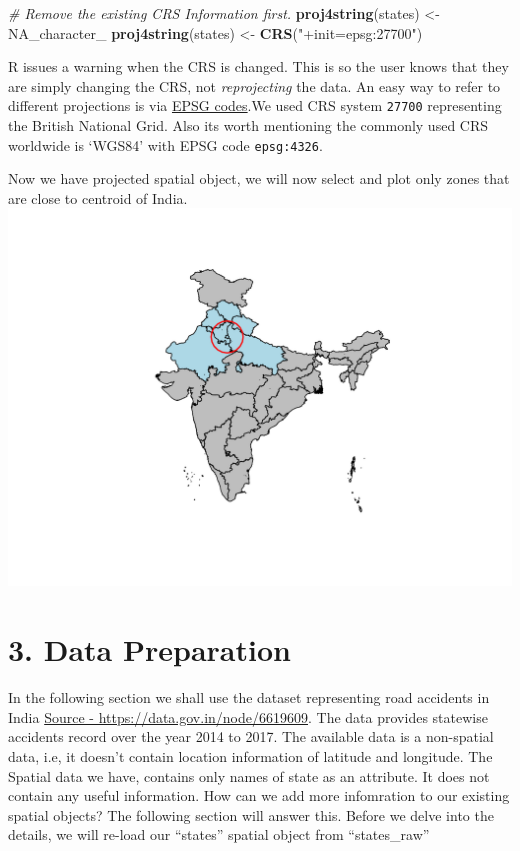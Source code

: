 \documentclass[]{article}
\newenvironment{Shaded}{}{}
\newcommand{\CommentTok}[1]{\textcolor[rgb]{0.38,0.63,0.69}{\textit{#1}}}
\newcommand{\KeywordTok}[1]{\textcolor[rgb]{0.00,0.44,0.13}{\textbf{#1}}}
\newcommand{\NormalTok}[1]{#1}
\newcommand{\OtherTok}[1]{\textcolor[rgb]{0.00,0.44,0.13}{#1}}
\newcommand{\StringTok}[1]{\textcolor[rgb]{0.25,0.44,0.63}{#1}}
\begin{document}
\begin{Shaded}
\begin{Highlighting}[]
\CommentTok{# Remove the existing CRS Information first.}
\KeywordTok{proj4string}\NormalTok{(states) <-}\StringTok{ }\OtherTok{NA_character_}
\KeywordTok{proj4string}\NormalTok{(states) <-}\StringTok{ }\KeywordTok{CRS}\NormalTok{(}\StringTok{"+init=epsg:27700"}\NormalTok{)}
\end{Highlighting}
\end{Shaded}

R issues a warning when the CRS is changed. This is so the user knows
that they are simply changing the CRS, not \emph{reprojecting} the data.
An easy way to refer to different projections is via
\href{http://www.epsg-registry.org/}{EPSG codes}.We used CRS system
\texttt{27700} representing the British National Grid. Also its worth
mentioning the commonly used CRS worldwide is `WGS84' with EPSG code
\texttt{epsg:4326}.

Now we have projected spatial object, we will now select and plot only
zones that are close to centroid of India.
\includegraphics{TutorialNotebook_files/figure-latex/unnamed-chunk-12-1.pdf}

\hypertarget{data-preparation}{%
\section{3. Data Preparation}\label{data-preparation}}

In the following section we shall use the dataset representing road
accidents in India \href{https://data.gov.in/node/6619609}{Source -
https://data.gov.in/node/6619609}. The data provides statewise accidents
record over the year 2014 to 2017. The available data is a non-spatial
data, i.e, it doesn't contain location information of latitude and
longitude. The Spatial data we have, contains only names of state as an
attribute. It does not contain any useful information. How can we add
more infomration to our existing spatial objects? The following section
will answer this. Before we delve into the details, we will re-load our
``states'' spatial object from ``states\_raw''
\end{document}

